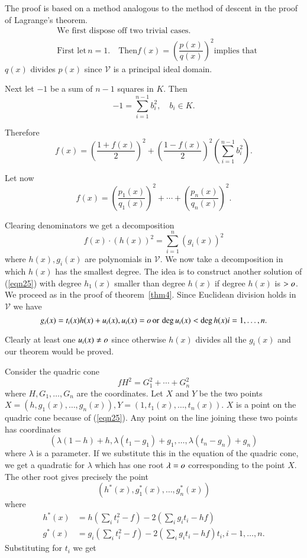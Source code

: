 \begin{Proof}
The proof is based on a method analogous to the method of descent in
the proof of Lagrange's theorem.
\begin{align*}
&\text{We first dispose off two trivial cases.}\\
&\text{First let}\, n=1. \quad \text{Then}
f(x)=\left(\dfrac{p(x)}{q(x)}\right)^{2} \text{implies that}
\end{align*}
$q(x)$ divides $p(x)$ since $\mathcal{V}$ is a principal ideal domain.

Next let $-1$ be a sum of $n-1$ squares in $K$. Then 
$$
-1=\sum\limits_{i=1}^{n-1}b^{2}_i, \quad b_i\in K.
$$

Therefore
$$
f(x)=\left(\dfrac{1+f(x)}{2}\right)^{2}+\left(\dfrac{1-f(x)}{2}\right)^{2}\left(\sum\limits^{n-1}_{i=1} b^{2}_i\right).
$$

Let now
$$
f(x)=\left(\dfrac{p_1(x)}{q_1(x)}\right)^{2}+\cdots+ \left(\dfrac{p_n(x)}{q_n(x)}\right)^{2}.
$$

Clearing denominators we get a decomposition
\begin{equation}\label{eqn25}
f(x)\cdot(h(x))^{2}=\sum\limits_{i=1}^{n}(g_i(x))^{2}
\end{equation}
where $h(x),g_i(x)$ are polynomials in $\mathcal{V}$. We now take a
decomposition in which $h(x)$ has the smallest degree. The idea is to
construct another solution of (\ref{eqn25}) with degree $h_1(x)$
smaller than degree $h(x)$ if degree $h(x)$ is $>o$. We proceed as
in the proof of theorem~\ref{thm4}. Since Euclidean division holds in
$\mathcal{V}$ we have
$$
g_i(x)=t_i(x)h(x)+u_i(x),u_i(x)=o\,\text{or}\, \deg u_i(x)<\deg
h(x)i=1,\ldots,n .
$$

Clearly at least one $u_i(x)\neq o$ since otherwise $h(x)$ divides
all the $g_i(x)$ and our theorem would be proved.

Consider the quadric cone
\begin{equation}\label{eqn26}
fH^{2}=G^{2}_1+\cdots+ G^{2}_n
\end{equation}
where $H, G_1,\ldots,G_n$ are the coordinates. Let $X$ and $Y$ be the
two points
$X=(h,g_1(x),\ldots,g_n(x)),Y=(1,t_1(x),\ldots,t_n(x))$. $X$ is a
point on the quadric cone because of (\ref{eqn25}). Any point on the
line joining these two points has coordinates
$$
(\lambda(1-h)+h,\lambda(t_1-g_1)+g_1,\ldots,\lambda(t_n-g_n)+g_n)
$$
where $\lambda$ is a parameter. If we substitute this in the equation
of the quadric cone, we get a quadratic for $\lambda$ which has one
root $\lambda=o$ corresponding to the point $X$. The other root
gives precisely the point
$$
(h^{\ast}(x),g^{\ast}_1(x),\ldots,g^{\ast}_n(x))
$$
where
\begin{align*}
h^{\ast}(x)&=h\left(\sum\limits_{i}t^{2}_i-f\right)-2\left(\sum\limits_{i} g_it_i-hf\right)\\
g^{\ast}(x)&=g_i\left(\sum\limits_{i}
t^{2}_i-f\right)-2\left(\sum\limits_{i}g_it_i-hf\right)t_i, i-1,\ldots,n.
\end{align*}
Substituting for $t_i$ we get


\end{Proof}
